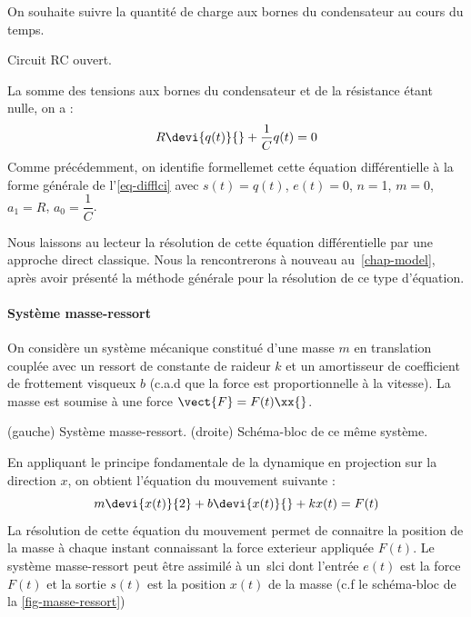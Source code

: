 On souhaite suivre la quantité de charge aux bornes du condensateur au 
cours du temps.
\begin{marginfigure}[-8em]   
    \centering
    
    \caption{Circuit RC ouvert.\label{fig-decharge_condensateur}}
\end{marginfigure}
La somme des tensions aux bornes du condensateur et de la résistance 
étant nulle, on a :
\begin{align*}
    R\devi{q(t)}{}+\dfrac{1}{C}q(t)=0 
\end{align*}
Comme précédemment, on identifie formellemet cette équation différentielle 
à la forme générale de l'\cref{eq-difflci} avec $s(t)=q(t)$, $e(t)=0$, 
$n=$1, $m=0$, $a_1=R$, $a_0=\dfrac{1}{C}$.

Nous laissons au lecteur la résolution de cette équation différentielle 
par une approche direct classique.
Nous la rencontrerons à nouveau au~\cref{chap-model}, après avoir 
présenté la méthode générale pour la résolution de ce type d'équation.
\paragraph{Système masse-ressort}
On considère un système mécanique constitué d'une masse $m$ en translation 
couplée avec un ressort de constante
de raideur $k$ et un amortisseur de coefficient de frottement 
visqueux $b$ (c.a.d que la force est 
proportionnelle à la vitesse). 
La masse est soumise à une force $\vect{F}=F(t)\xx{}$.
\begin{marginfigure}[-8em]
    \centering
    
    \caption{(gauche) Système masse-ressort. (droite) Schéma-bloc de ce même 
    système.
    \label{fig-masse-ressort}}
\end{marginfigure}
En appliquant le principe fondamentale de la dynamique en projection 
sur la direction $x$, on obtient l'équation du mouvement suivante :
\[
m\devi{x(t)}{2}+b\devi{x(t)}{}+kx(t)=F(t)
\]
\newpage
\restoregeometry
\captionsetup{width=0.9\linewidth}
La résolution de cette équation du mouvement permet de connaitre la position 
de la masse à chaque instant connaissant la force exterieur 
appliquée $F(t)$. Le système masse-ressort peut être assimilé à un~\gls{slci} 
dont l'entrée $e(t)$ est la force $F(t)$ et la sortie $s(t)$ est la 
position $x(t)$ de la masse (c.f le schéma-bloc de la \cref{fig-masse-ressort})

